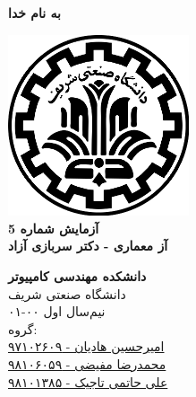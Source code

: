 \documentclass{article}
\begin{document}
\begin{titlepage}
	\begin{center}
		\textbf{ \Huge{به نام خدا}}
	
		\vspace{0.2cm}
		
		\includegraphics[width=0.4\textwidth]{sharif.png}\\
		\vspace{0.2cm}
		\textbf{ \Huge{آزمایش شماره 5}}\\
		\vspace{0.25cm}
		\textbf{ \Large{آز معماری - دکتر سربازی آزاد}}
		\vspace{0.2cm}
		
		
		\large \textbf{دانشکده مهندسی کامپیوتر}\\\vspace{0.1cm}
		\large   دانشگاه صنعتی شریف\\\vspace{0.2cm}
		\large   ﻧﯿﻢ‌سال اول ۰۰-۰۱ \\\vspace{0.10cm}
		\large{ گروه:}\\
		\large{\href{mailto:a.h.hadian@gmail.com}{امیرحسین هادیان - ۹۷۱۰۲۶۰۹}}\\
		\large{\href{mailto:mofayezi.m@gmail.com}{محمدرضا مفیضی - ۹۸۱۰۶۰۵۹}}\\
		\large{\href{mailto:a.hatam008@gmail.com}{علی حاتمی تاجیک - ۹۸۱۰۱۳۸۵}}\\
	\end{center}
\end{titlepage}

\newpage

\pagestyle{fancy}
\fancyhf{}
\fancyfoot{}
\setlength{\headheight}{59pt}
\cfoot{\thepage}
\end{document}
